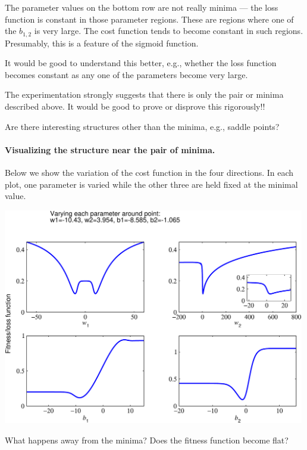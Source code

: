 \documentclass[12pt,a4paper]{article}
\begin{document}
The parameter values on the bottom row are not really minima --- the loss function is constant in
those parameter regions.  These are regions where one of the $b_{1,2}$ is very large.  The cost
function tends to become constant in such regions.  Presumably, this is a feature of the sigmoid
function.  

It would be good to understand this better, e.g., whether the loss function becomes constant as any
one of the parameters become very large.

The experimentation strongly suggests that there is only the pair or minima described above.  It
would be good to prove or disprove this rigorously!!   

Are there interesting structures other than the minima, e.g., saddle points?  



\paragraph{Visualizing the structure near the pair of minima.}

Below we show the variation of the cost function in the four directions.  In each plot, one
parameter is varied while the other three are held fixed at the minimal value.

\smallskip

\begin{center}
\includegraphics[width=0.99\textwidth]{Images/3node_largedomain_fitness_a_01}
\end{center}


What happens away from the minima?  Does the fitness function become flat?  
\end{document}
